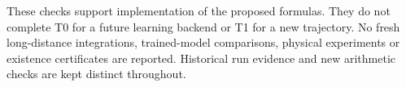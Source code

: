These checks support implementation of the proposed formulas. They
do not complete T0 for a future learning backend or T1 for a new
trajectory. No fresh long-distance integrations, trained-model
comparisons, physical experiments or existence certificates are
reported. Historical run evidence and new arithmetic checks are
kept distinct throughout.
